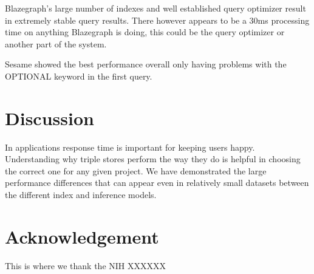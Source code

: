 \documentclass{llncs}
\begin{document}
Blazegraph's large number of indexes and well established query optimizer result in extremely stable query results.  There however appears to be a 30ms processing time on anything Blazegraph is doing, this could be the query optimizer or another part of the system. 

Sesame showed the best performance overall only having problems with the OPTIONAL keyword in the first query.

\section{Discussion}
In applications response time is important for keeping users happy.  Understanding why triple stores perform the way they do is helpful in choosing the correct one for any given project.  We have demonstrated the large performance differences that can appear even in relatively small datasets between the different index and inference models.

\section*{Acknowledgement}
This is where we thank the NIH XXXXXX



\end{document}
